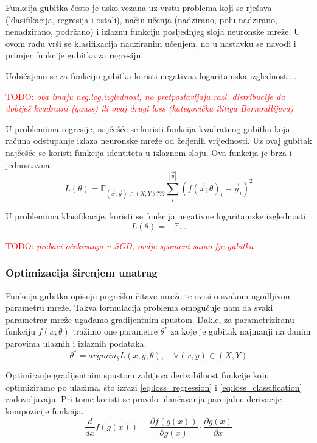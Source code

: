 \documentclass[times, utf8, diplomski]{fer}
\def\expect{\mathbb{E}}
\def\pfrac#1#2{\frac{\partial #1}{\partial #2}}
\def\dfrac#1#2{\frac{d #1}{d #2}}
\def\TODO#1{\noindent\textcolor{red}{TODO: \textit{#1}}\newline}
\def\todo#1{\TODO{#1}}
\begin{document}
Funkcija gubitka često je usko vezana uz vrstu problema koji se rješava (klasifikacija, regresija i ostali), način učenja (nadzirano, polu-nadzirano, nenadzirano, podržano) i izlaznu funkciju posljednjeg sloja neuronske mreže. U ovom radu vrši se klasifikacija nadziranim učenjem, no u nastavku se navodi i primjer funkcije gubitka za regresiju.

Uobičajeno se za funkciju gubitka koristi negativna logaritamska izglednost ...

\todo{oba imaju neg.log.izglednost, no pretpostavljaju razl. distribucije da dobiješ kvadratni (gauss) ili ovaj drugi loss (kategorička ilitiga Bernoullijeva)}

U problemima regresije, najčešće se koristi funkcija kvadratnog gubitka koja računa odstupanje izlaza neuronske mreže od željenih vrijednosti. Uz ovaj gubitak najčešće se koristi funkcija identiteta u izlaznom sloju. Ova funkcija je brza i jednostavna
\begin{equation}
\label{eq:loss_regression}
L(\theta) = \expect_{(\vec{x},\vec{y})\in (X,Y)???} \sum_{i}^{|\vec{y}|} (f(\vec{x};\theta)_i - \vec{y}_i)^2
\end{equation}

U problemima klasifikacije, koristi se funkcija negativne logaritamske izglednosti. 
\begin{equation}
\label{eq:loss_classification}
L(\theta) = -\expect ...
\end{equation}

\todo{prebaci očekivanja u SGD, ovdje spomeni samo fje gubitka}

\subsubsection{Optimizacija širenjem unatrag}
\label{sec:backprop}
Funkcija gubitka opisuje pogrešku čitave mreže te ovisi o svakom ugodljivom parametru mreže. Takva formulacija problema omogućuje nam da svaki parametrar mreže ugađamo gradijentnim spustom. Dakle, za parametriziranu funkciju $f(x;\theta)$ tražimo one parametre $\theta^*$ za koje je gubitak najmanji na danim parovima ulaznih i izlaznih podataka.
\begin{equation}
\theta^* = argmin_\theta L(x,y; \theta), \quad \forall (x,y) \in (X,Y)
\end{equation}

Optimiranje gradijentnim spustom zahtjeva derivabilnost funkcije koju optimiziramo po ulazima, što izrazi \eqref{eq:loss_regression} i \eqref{eq:loss_classification} zadovoljavaju. Pri tome koristi se pravilo ulančavanja parcijalne derivacije kompozicije funkcija.
\begin{equation}
\dfrac{}{x} f(g(x)) = \pfrac{f(g(x))}{g(x)} \cdot \pfrac{g(x)}{x}
\end{equation}
\end{document}
